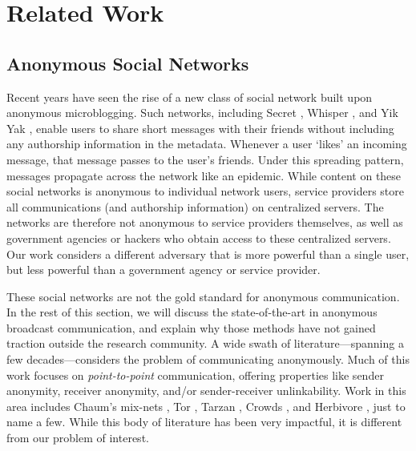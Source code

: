 \documentclass[10pt, twocolumn]{article}
\begin{document}
\section{Related Work}

\subsection{Anonymous Social Networks} 
Recent years have seen the rise of a new class of social network built upon anonymous microblogging.
Such networks, including Secret \cite{secret}, Whisper \cite{whisper}, and Yik Yak \cite{yikyak}, enable users to share short messages with their friends without including any authorship information in the metadata. 
Whenever a user `likes' an incoming message, that message passes to the user's friends.
Under this spreading pattern, messages propagate across the network like an epidemic.
While content on these social networks is anonymous to individual network users, service providers store all communications (and authorship information) on centralized servers.
The networks are therefore not anonymous to service providers themselves, as well as government agencies or hackers who obtain access to these centralized servers.
Our work considers a different adversary that is more powerful than a single user, but less powerful than a government agency or service provider.

These social networks are not the gold standard for anonymous communication. In the rest of this section, we will discuss the state-of-the-art in anonymous broadcast communication, and explain why those methods have not gained traction outside the research community.
A wide swath of literature---spanning a few decades---considers the problem of communicating anonymously.
Much of this work focuses on \emph{point-to-point} communication, offering properties like sender anonymity, receiver anonymity, and/or sender-receiver unlinkability. 
Work in this area includes Chaum's mix-nets \cite{chaum1981untraceable}, Tor \cite{tor}, Tarzan \cite{tarzan}, Crowds \cite{reiter1998crowds}, and Herbivore \cite{goel2003herbivore}, just to name a few.
While this body of literature has been very impactful, it is different from our problem of interest.
\end{document}
